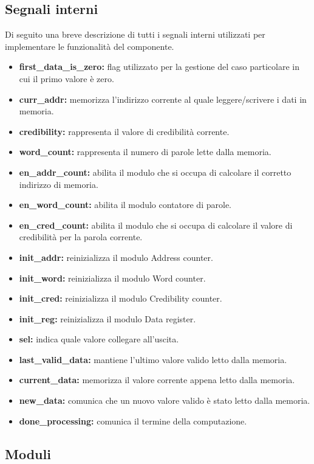 \subsection{Segnali interni}
  Di seguito una breve descrizione di tutti i segnali interni utilizzati per implementare le funzionalità del componente.
\begin{itemize}
  \item \textbf{{first\_data\_is\_zero}:} flag utilizzato per la gestione del caso particolare in cui il primo valore è zero.
  \item \textbf{{curr\_addr}:} memorizza l'indirizzo corrente al quale leggere/scrivere i dati in memoria.
  \item \textbf{{credibility}:} rappresenta il valore di credibilità corrente.
  \item \textbf{{word\_count}:} rappresenta il numero di parole lette dalla memoria.
  \item \textbf{{en\_addr\_count}:} abilita il modulo che si occupa di calcolare il corretto indirizzo di memoria.
  \item \textbf{{en\_word\_count}:} abilita il modulo contatore di parole.
  \item \textbf{{en\_cred\_count}:} abilita il modulo che si occupa di calcolare il valore di credibilità per la parola corrente.
  \item \textbf{{init\_addr}:} reinizializza il modulo Address counter.
  \item \textbf{{init\_word}:} reinizializza il modulo Word counter.
  \item \textbf{{init\_cred}:} reinizializza il modulo Credibility counter.
  \item \textbf{{init\_reg}:} reinizializza il modulo Data register. 
  \item \textbf{{sel}:} indica quale valore collegare all'uscita.
  \item \textbf{{last\_valid\_data}:} mantiene l'ultimo valore valido letto dalla memoria.
  \item \textbf{{current\_data}:} memorizza il valore corrente appena letto dalla memoria.
  \item \textbf{{new\_data}:} comunica che un nuovo valore valido è stato letto dalla memoria.
  \item \textbf{{done\_processing}:} comunica il termine della computazione.
\end{itemize}
\subsection{Moduli}
